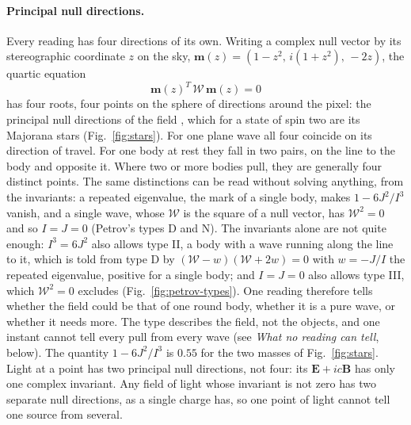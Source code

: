 \paragraph{Principal null directions.} Every reading has four directions of its own. Writing a
complex null vector by its stereographic coordinate $z$ on the sky,
$\mathbf{m}(z) = (1 - z^2,\, i(1 + z^2),\, -2z)$, the quartic equation
\begin{equation}\label{eq:stars}
\mathbf{m}(z)^{T}\,\mathcal{W}\,\mathbf{m}(z) = 0
\end{equation}
has four roots, four points on the sphere of directions around the pixel: the
principal null directions of the field \cite{Penrose1960}, which for a state
of spin two are its Majorana stars \cite{Bruno2019} (Fig.~\ref{fig:stars}). For one plane wave all four coincide on its
direction of travel. For one body at rest they fall in two pairs, on the line to
the body and opposite it. Where two or more bodies pull, they are generally four
distinct points. The same
distinctions can be read without solving anything, from the invariants: a
repeated eigenvalue, the mark of a single body, makes
$1 - 6J^2/I^3$ vanish, and a single wave, whose $\mathcal W$ is the square of a
null vector, has $\mathcal W^2 = 0$ and so $I = J = 0$ (Petrov's types D and N).
The invariants alone are not quite enough: $I^3 = 6J^2$ also allows type II, a
body with a wave running along the line to it, which is told from type D by
$(\mathcal W - w)(\mathcal W + 2w) = 0$ with $w = -J/I$ the repeated
eigenvalue, positive for a single body; and $I = J = 0$ also allows type III,
which $\mathcal W^2 = 0$ excludes (Fig.~\ref{fig:petrov-types}). One reading therefore tells whether the field could be that of one
round body, whether it is a pure wave, or whether it needs more. The type
describes the field, not the objects, and one instant cannot tell every pull
from every wave (see \emph{What no reading can tell}, below). The quantity
$1 - 6J^2/I^3$ is $0.55$ for the two masses of Fig.~\ref{fig:stars}.
Light at a point has two principal null directions, not four: its $\mathbf{E} + ic\mathbf{B}$ has
only one complex invariant. Any field of light whose invariant is not zero has two
separate null directions, as a single charge has, so one point of light cannot tell one
source from several.

